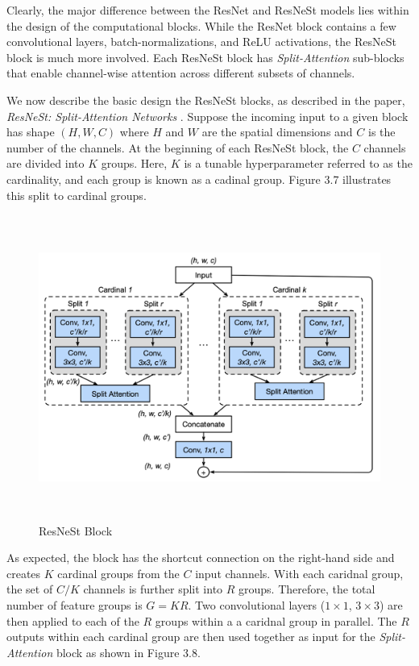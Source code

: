 \documentclass [MAS] {uclathes}
\begin{document}
Clearly, the major difference between the ResNet and ResNeSt models lies within the design of the computational blocks. While the ResNet block contains a few convolutional layers, batch-normalizations, and ReLU activations, the ResNeSt block is much more involved. Each ResNeSt block has \textit{Split-Attention} sub-blocks that enable channel-wise attention across different subsets of channels. 

We now describe the basic design the ResNeSt blocks, as described in the paper, \textit{ResNeSt: Split-Attention Networks} \cite{resnest}. Suppose the incoming input to a given block has shape $(H, W, C)$ where $H$ and $W$ are the spatial dimensions and $C$ is the number of the channels. At the beginning of each ResNeSt block, the $C$ channels are divided into $K$ groups. Here, $K$ is a tunable hyperparameter referred to as the cardinality, and each group is known as a cadinal group. Figure 3.7 illustrates this split to cardinal groups.

\begin{figure}[h]
\centering
\includegraphics[height = 100mm, width= 130mm]{imgs/resnest_block.png}
\caption{ResNeSt Block}
\label{fig:resnest_block}
\end{figure}

As expected, the block has the shortcut connection on the right-hand side and creates $K$ cardinal groups from the $C$ input channels. With each caridnal group, the set of $C/K$ channels is further split into $R$ groups. Therefore, the total number of feature groups is $G = KR$. Two convolutional layers ($1 \times 1$, $3 \times 3$) are then applied to each of the $R$ groups within a a caridnal group in parallel. The $R$ outputs within each cardinal group are then used together as input for the \textit{Split-Attention} block as shown in Figure 3.8.
\end{document}
